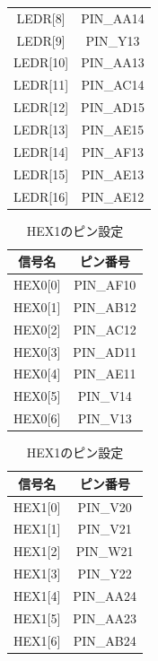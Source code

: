 \documentclass[12pt,a4paper]{ltjsarticle}
\begin{document}
\begin{table}[H]
\begin{minipage}[t]{0.48\linewidth}
\begin{tabular}{cc}
      LEDR{[8]}  & PIN\_AA14 \\
      LEDR{[9]}  & PIN\_Y13  \\
      LEDR{[10]} & PIN\_AA13 \\
      LEDR{[11]} & PIN\_AC14 \\
      LEDR{[12]} & PIN\_AD15 \\
      LEDR{[13]} & PIN\_AE15 \\
      LEDR{[14]} & PIN\_AF13 \\
      LEDR{[15]} & PIN\_AE13 \\
      LEDR{[16]} & PIN\_AE12 \\
      \bottomrule
    \end{tabular}
  \end{minipage}
\end{table}

\begin{table}[H]
  \begin{minipage}[t]{0.48\linewidth}
    \centering
    \caption{HEX0のピン設定}
    \label{tab:pin-hex0}
    \begin{tabular}{cc}
      \toprule
      信号名 & ピン番号 \\
      \midrule
      HEX0{[0]} & PIN\_AF10 \\
      HEX0{[1]} & PIN\_AB12 \\
      HEX0{[2]} & PIN\_AC12 \\
      HEX0{[3]} & PIN\_AD11 \\
      HEX0{[4]} & PIN\_AE11 \\
      HEX0{[5]} & PIN\_V14  \\
      HEX0{[6]} & PIN\_V13  \\
      \bottomrule
    \end{tabular}
  \end{minipage}
  \hfill
  \begin{minipage}[t]{0.48\linewidth}
    \centering
    \caption{HEX1のピン設定}
    \label{tab:pin-hex1}
    \begin{tabular}{cc}
      \toprule
      信号名 & ピン番号 \\
      \midrule
      HEX1{[0]} & PIN\_V20  \\
      HEX1{[1]} & PIN\_V21  \\
      HEX1{[2]} & PIN\_W21  \\
      HEX1{[3]} & PIN\_Y22  \\
      HEX1{[4]} & PIN\_AA24 \\
      HEX1{[5]} & PIN\_AA23 \\
      HEX1{[6]}& PIN\_AB24 \\
      \bottomrule
    \end{tabular}
  \end{minipage}
\end{table}
\end{document}
